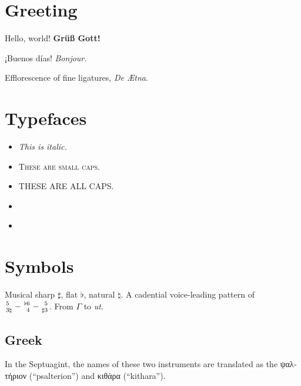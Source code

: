 \documentclass{article}
\newcommand{\musicfig}[2]{{{#1}\atop{#2}}}
\newcommand{\blankfig}{\hphantom{\sharp}}
\begin{document}

\section{%
Greeting
}

Hello, world!
\textbf{Grüß Gott!}

¡Buenos días!
\emph{Bonjour.}

Efflorescence of fine ligatures, \emph{De Ætna}.

\section{%
Typefaces
}

\begin{itemize}
	\item{%
		\emph{This is italic.}
	} \item{%
		\textsc{These are small caps.}
	} \item{%
		THESE ARE ALL CAPS.
	} \item{%
	} \item{%
	}
\end{itemize}

\section{%
Symbols
}

Musical sharp $\sharp$, flat $\flat$, natural $\natural$. 
A cadential voice-leading pattern of ${{5\hphantom{\natural}}\atop{3\natural}}-\musicfig{\flat6}{\blankfig4}-\musicfig{\blankfig5}{\sharp3}$.
From $\Gamma$ to \emph{ut}.

\subsection{%
Greek
}

In the Septuagint, the names of these two instruments are translated as the \textgreek{ψαλτήριον} (``psalterion'') and \textgreek{κιθάρα} (``kithara'').

\end{document}
